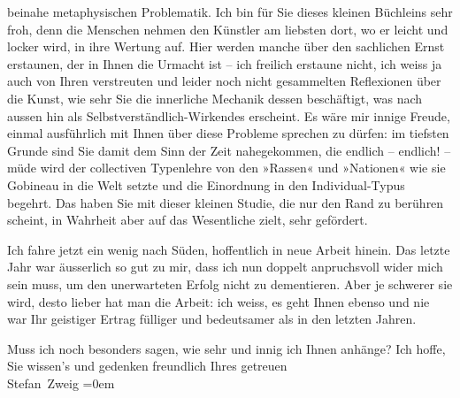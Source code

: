                beinahe metaphysischen Problematik. Ich bin für Sie dieses kleinen Büchleins sehr froh, denn die Menschen nehmen den Künstler am
               liebsten dort, wo er leicht und locker wird, in ihre Wertung auf. Hier werden manche
               über den sachlichen Ernst erstaunen, der in Ihnen die Urmacht ist – ich freilich
               erstaune nicht, ich weiss ja auch von Ihren verstreuten und leider noch nicht
               gesammelten Reflexionen über die Kunst, wie sehr Sie die innerliche Mechanik dessen
               beschäftigt, was nach aussen hin als Selbstverständlich-Wirkendes erscheint. Es wäre
               mir innige Freude, einmal ausführlich mit Ihnen über diese Probleme sprechen zu
               dürfen: im tiefsten Grunde sind Sie damit dem Sinn der Zeit nahegekommen, die endlich
               – endlich! – müde wird der collectiven Typenlehre von den »Rassen« und »Nationen« wie
               sie Gobineau in die Welt setzte und die  Einordnung in den \introOben{}Individual-\introOben{}Typus begehrt. Das haben Sie mit {\pb}dieser kleinen Studie, die nur den Rand zu berühren scheint, in Wahrheit
               aber auf das Wesentliche zielt, sehr gefördert.\pend
           
\pstart
           Ich fahre jetzt ein wenig nach Süden, hoffentlich in neue Arbeit hinein. Das letzte
               Jahr war äusserlich so gut zu mir, dass ich nun doppelt anpruchsvoll wider mich sein
               muss, um den unerwarteten Erfolg nicht zu dementieren. Aber je schwerer sie wird,
               desto lieber hat man die Arbeit: ich weiss, es geht Ihnen ebenso und nie war Ihr
               geistiger Ertrag fülliger und bedeutsamer als in den letzten Jahren.\pend
           
\pstart
           Muss ich noch besonders sagen, wie sehr und innig ich Ihnen anhänge? Ich hoffe,
               Sie wissen’s und gedenken freundlich Ihres getreuen{\\[\baselineskip]}\spacefill\mbox{Stefan Zweig}\pend
           \leftskip=0em{}\endnumbering{}
\begin{anhang}
\end{anhang}
      
